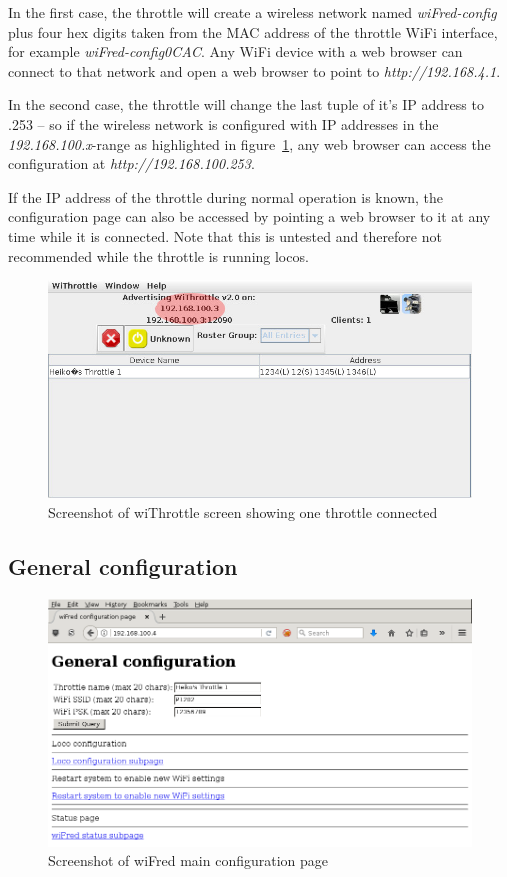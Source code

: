 \documentclass[11pt,a4paper]{scrartcl}
\begin{document}
In the first case, the throttle will create a wireless network named \textit{wiFred-config} plus four hex digits taken from the MAC address of the throttle WiFi interface, for example \textit{wiFred-config0CAC}. Any WiFi device with a web browser can connect to that network and open a web browser to point to \textit{http://192.168.4.1}.

In the second case, the throttle will change the last tuple of it's IP address to .253 -- so if the wireless network is configured with IP addresses in the \textit{192.168.100.x}-range as highlighted in figure~\ref{withrottleScreenshot}, any web browser can access the configuration at \textit{http://192.168.100.253}.

If the IP address of the throttle during normal operation is known, the configuration page can also be accessed by pointing a web browser to it at any time while it is connected. Note that this is untested and therefore not recommended while the throttle is running locos.

\begin{figure}[tbh]
  \centering
  \includegraphics[width=0.8 \textwidth]{images/withrottle_Screenshot}
  \caption{Screenshot of wiThrottle screen showing one throttle connected}
  \label{withrottleScreenshot}
\end{figure}

\subsection{General configuration} \label{throttle_GeneralConf}

\begin{figure}[tbh]
  \centering
  \includegraphics[width=0.8 \textwidth]{images/screenShot_main}
  \caption{Screenshot of wiFred main configuration page}
  \label{throttleConfMainPage}
\end{figure}
\end{document}
